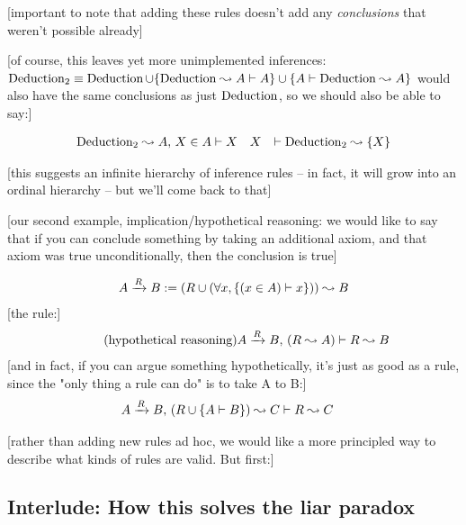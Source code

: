 \documentclass{article}
\begin{document}
  [important to note that adding these rules doesn't add any \emph{conclusions} that weren't possible already]
  
  [of course, this leaves yet more unimplemented inferences: $\operatorname{\mathrm{Deduction}}_2 \equiv \operatorname{\mathrm{Deduction}} \cup \{\operatorname{\mathrm{Deduction}} \leadsto A \vdash A\} \cup \{A \vdash \operatorname{\mathrm{Deduction}} \leadsto A\}$ would also have the same conclusions as just $\operatorname{\mathrm{Deduction}}$, so we should also be able to say:]
  
  \begin{align*}
    \operatorname{\mathrm{Deduction}}_2 \leadsto A ,\, X \in A &\vdash X && 
    X &\vdash \operatorname{\mathrm{Deduction}}_2 \leadsto \{X\}
  \end{align*}
   
  [this suggests an infinite hierarchy of inference rules – in fact, it will grow into an ordinal hierarchy – but we'll come back to that]
  
  [our second example, implication/hypothetical reasoning: we would like to say that if you can conclude something by taking an additional axiom, and that axiom was true unconditionally, then the conclusion is true]
  
  \renewcommand{\implies}[1]{\xrightarrow{#1}}
  
  \begin{align*}
    A \implies{R} B := (R \union (\forall x, \singleton{(x \in A) \infrule x})) \concludes B\\
  \end{align*}
  [the rule:]
  \begin{align*}
    \tag{hypothetical reasoning}\label{hyp}
    \globalrule{A \implies{R} B \presep (R \concludes A)}{R \concludes B}\\
  \end{align*}
  [and in fact, if you can argue something hypothetically, it's just as good as a rule, since the "only thing a rule can do" is to take A to B:]
  \begin{align*}
    \globalrule{A \implies{R} B \presep (R \union \singleton{A \infrule B}) \concludes C}{R \concludes C}
  \end{align*}
  
  [rather than adding new rules ad hoc, we would like a more principled way to describe what kinds of rules are valid. But first:]
  
  \subsection{Interlude: How this solves the liar paradox}
  
\end{document}
